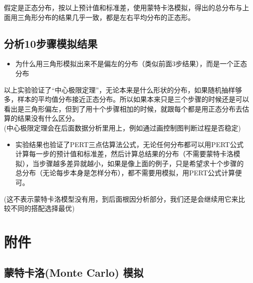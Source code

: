 假定是正态分布，按以上预计值和标准差，使用蒙特卡洛模拟，得出的总分布与上面用三角形分布的结果几乎一致，都是左右平均分布的正态形。

\hypertarget{ux5206ux679010ux6b65ux9aa4ux6a21ux62dfux7ed3ux679c}{%
\subsection{分析10步骤模拟结果}\label{ux5206ux679010ux6b65ux9aa4ux6a21ux62dfux7ed3ux679c}}

\begin{itemize}
\tightlist
\item
  为什么用三角形模拟出来不是偏左的分布（类似前面3步结果），而是一个正态分布
\end{itemize}

\begin{description}
\tightlist
\item[]
以上实验验证了``中心极限定理''，无论本来是什么形状的分布，如果随机抽样够多，样本的平均值分布接近正态分布。所以如果本来只是三个步骤的时候还是可以看出是三角形偏左，但到了用十个步骤相加的时候，就跟每个都是用正态分布去估算的结果没有什么区分。\\

(中心极限定理会在后面数据分析里用上，例如通过画控制图判断过程是否稳定)\\
\end{description}

\begin{itemize}
\tightlist
\item
  实验结果也验证了PERT三点估算法公式，无论任何分布都可以用PERT公式计算每一步的预计值和标准差，然后计算总结果的分布（不需要蒙特卡洛模拟），当步骤越多差异就越小，如果是像上面的例子，只是希望求十个步骤的总分布（无论每步本身是怎样分布），都不需要用模拟，用PERT公式计算便可。\\
\end{itemize}

\begin{description}
\tightlist
\item[]
(这不表示蒙特卡洛模型没有用，到后面根因分析部分，我们还是会继续用它来比较不同的搭配选择最优)
\end{description}

\hypertarget{ux9644ux4ef6}{%
\section{附件}\label{ux9644ux4ef6}}

\hypertarget{ux8499ux5730ux5361ux7f57monte-carlo-ux6a21ux62df}{%
\subsection{蒙特卡洛(Monte Carlo)
模拟}\label{ux8499ux5730ux5361ux7f57monte-carlo-ux6a21ux62df}}

